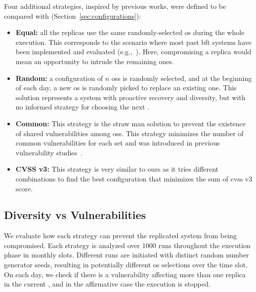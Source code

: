 Four additional strategies, inspired by previous works, were defined to be compared with \system (Section~\ref{sec:configurations}):

\begin{itemize}

\item \textbf{Equal:} all the replicas use the same randomly-selected \gls{os} during the whole execution. 
This corresponds to the scenario where most past \gls{bft} systems have been implemented and evaluated (e.g.,~\cite{Kotla:2010,Aublin:2015,Behl:2015,Veronese:2013,Behl:2017,Liu:2016,Yin:2003,Amir:2011,Bessani:2014,Clement:2009b}). 
Here, compromising a replica would mean an opportunity to intrude the remaining ones.

\item \textbf{Random:} a configuration of $n$ \glspl{os} is randomly selected, and at the beginning of each day, a new \gls{os} is randomly picked to replace an existing one. 
This solution represents a system with proactive recovery and diversity, but with no informed strategy for choosing the next \configuration.

\item \textbf{Common:} This strategy is the straw man solution to prevent the existence of shared vulnerabilities among \glspl{os}. 
This strategy minimizes the number of common vulnerabilities for each set and was introduced in previous vulnerability studies~\cite{Garcia:2012}.

\item \textbf{CVSS v3:} This strategy is very similar to ours as it tries different combinations to find the best configuration that minimizes the sum of \gls{cvss} v3 score.


\end{itemize}


\subsection{Diversity vs Vulnerabilities}
We evaluate how each strategy can prevent the replicated system from being compromised. 
Each strategy is analyzed over $1000$ runs throughout the execution phase in monthly slots. 
Different runs are initiated with distinct random number generator seeds, resulting in potentially different \gls{os} selections over the time slot. 
On each day, we check if there is a vulnerability affecting more than one replica in the current \configuration, and in the affirmative case the execution is stopped.

